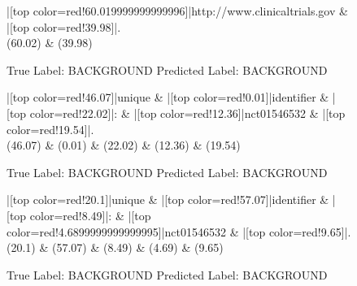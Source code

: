 \documentclass[a4paper, landscape]{article}
\begin{document}
\clearpage
\begin{figure}
\begin{center}
\begin{dependency}
\begin{deptext}
|[top color=red!60.019999999999996]|http://www.clinicaltrials.gov \& |[top color=red!39.98]|.\\
(60.02) \& (39.98)\\
\end{deptext}
\end{dependency}
\end{center}
\caption{True Label: BACKGROUND Predicted Label: BACKGROUND}
\end{figure}
\clearpage
\begin{figure}
\begin{center}
\begin{dependency}
\begin{deptext}
|[top color=red!46.07]|unique \& |[top color=red!0.01]|identifier \& |[top color=red!22.02]|: \& |[top color=red!12.36]|nct01546532 \& |[top color=red!19.54]|.\\
(46.07) \& (0.01) \& (22.02) \& (12.36) \& (19.54)\\
\end{deptext}
\end{dependency}
\end{center}
\caption{True Label: BACKGROUND Predicted Label: BACKGROUND}
\end{figure}
\clearpage
\begin{figure}
\begin{center}
\begin{dependency}
\begin{deptext}
|[top color=red!20.1]|unique \& |[top color=red!57.07]|identifier \& |[top color=red!8.49]|: \& |[top color=red!4.6899999999999995]|nct01546532 \& |[top color=red!9.65]|.\\
(20.1) \& (57.07) \& (8.49) \& (4.69) \& (9.65)\\
\end{deptext}
\end{dependency}
\end{center}
\caption{True Label: BACKGROUND Predicted Label: BACKGROUND}
\end{figure}
\end{document}
